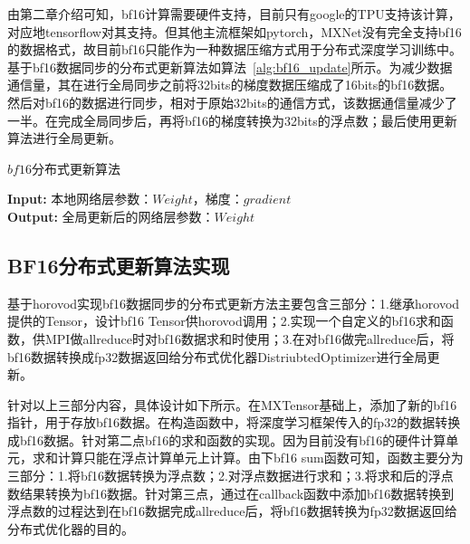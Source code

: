 由第二章介绍可知，bf16计算需要硬件支持，目前只有google的TPU支持该计算，对应地tensorflow对其支持。但其他主流框架如pytorch，MXNet没有完全支持bf16的数据格式，故目前bf16只能作为一种数据压缩方式用于分布式深度学习训练中。基于bf16数据同步的分布式更新算法如算法~\ref{alg:bf16_update}所示。为减少数据通信量，其在进行全局同步之前将32bits的梯度数据压缩成了16bits的bf16数据。然后对bf16的数据进行同步，相对于原始32bits的通信方式，该数据通信量减少了一半。在完成全局同步后，再将bf16的梯度转换为32bits的浮点数；最后使用更新算法进行全局更新。

\begin{algorithm}\small
\caption{$bf16$分布式更新算法}
\textbf{Input:}
本地网络层参数：$Weight$，梯度：$gradient$ \\
\textbf{Output:} 
全局更新后的网络层参数：$Weight$
\begin{algorithmic}[1]
\end{algorithmic}
	\label{alg:bf16_update}
\end{algorithm}

\subsection{BF16分布式更新算法实现}
基于horovod实现bf16数据同步的分布式更新方法主要包含三部分：1.继承horovod提供的Tensor，设计bf16 Tensor供horovod调用；2.实现一个自定义的bf16求和函数，供MPI做allreduce时对bf16数据求和时使用；3.在对bf16做完allreduce后，将bf16数据转换成fp32数据返回给分布式优化器DistriubtedOptimizer进行全局更新。

针对以上三部分内容，具体设计如下所示。在MXTensor基础上，添加了新的bf16指针，用于存放bf16数据。在构造函数中，将深度学习框架传入的fp32的数据转换成bf16数据。针对第二点bf16的求和函数的实现。因为目前没有bf16的硬件计算单元，求和计算只能在浮点计算单元上计算。由下bf16 sum函数可知，函数主要分为三部分：1.将bf16数据转换为浮点数；2.对浮点数据进行求和；3.将求和后的浮点数结果转换为bf16数据。针对第三点，通过在callback函数中添加bf16数据转换到浮点数的过程达到在bf16数据完成allreduce后，将bf16数据转换为fp32数据返回给分布式优化器的目的。


